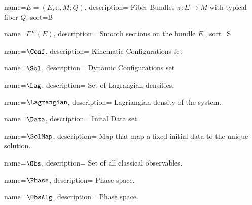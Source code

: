 \usepackage{glossaries}

\makenoidxglossaries


%
{%
	name={\ensuremath{E = (E,\pi , M;Q)}},
	description={ Fiber Bundles $\pi: E\rightarrow M$ with typical fiber $Q$},
    sort={B}
}

%
{%
	name={\ensuremath{\Gamma^\infty(E)}},
	description={ Smooth sections on the bundle $E$.},
    sort={S}
}


	{%
		name={\ensuremath{\Conf}},
		description={ Kinematic Configurations set}
	}

	{%
		name={\ensuremath{\Sol}},
		description={ Dynamic Configurations set}
	}

		
	{%
		name={\ensuremath{\Lag}},
		description={ Set of Lagrangian densities.}
	}
		
	{%
		name={\ensuremath{\Lagrangian}},
		description={ Lagriangian density of the system.}
	}
		
	{%
		name={\ensuremath{\Data}},
		description={ Inital Data set.}
	}
		
	{%
		name={\ensuremath{\SolMap}},
		description={ Map that map a fixed initial data to the unique solution.}
	}
		
	{%
		name={\ensuremath{\Obs}},
		description={ Set of all classical observables.}
	}

	{%
		name={\ensuremath{\Phase}},
		description={ Phase space.}
	}
	
	{%
		name={\ensuremath{\ObsAlg}},
		description={ Phase space.}
	}

